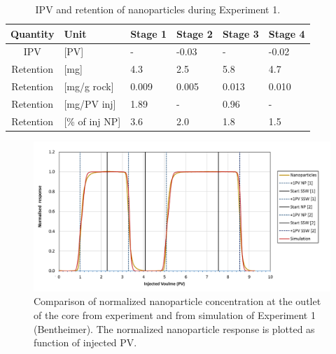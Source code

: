 \documentclass[nanomaterials,article,submit,moreauthors,pdftex]{Definitions/mdpi}
\begin{document}
\begin{table}[h!] %
\small
\centering
\caption{IPV and retention of nanoparticles during Experiment 1.}
\label{tab:ipvexp1}
\begin{tabular}{c l l l l l } 
\toprule
\textbf{Quantity} & \textbf{Unit} & \textbf{Stage 1} & \textbf{Stage 2} & \textbf{Stage 3} & \textbf{Stage 4} \\ 
\midrule 
IPV         & [PV]          & -         & -0.03     & -         & -0.02     \\
Retention   & [mg]          & 4.3       & 2.5       & 5.8       & 4.7       \\ 
Retention   & [mg/g rock]   & 0.009     & 0.005     & 0.013     & 0.010     \\ 
Retention   & [mg/PV inj]   & 1.89      & -         & 0.96      & -         \\
Retention   & [\% of inj NP]& 3.6       & 2.0       & 1.8       & 1.5       \\ 
\bottomrule
\end{tabular}
\end{table}

\begin{figure}[h!]
    \centering
    \includegraphics[width=.8\textwidth]{fig/simExpNP.png}
    \caption{Comparison of normalized nanoparticle concentration at the outlet of the core from experiment and from simulation of Experiment 1 (Bentheimer). The normalized nanoparticle response is plotted as function of injected PV.}
    \label{cht:simExpNP}
\end{figure}
\end{document}
